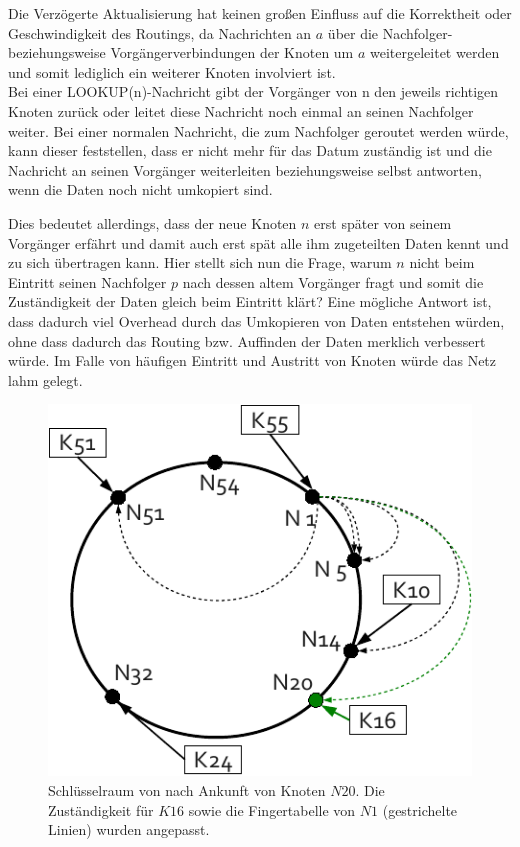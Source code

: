 Die Verzögerte Aktualisierung hat keinen großen Einfluss auf die Korrektheit oder Geschwindigkeit des Routings, da Nachrichten an $a$ über die Nachfolger- beziehungsweise Vorgängerverbindungen der Knoten um $a$ weitergeleitet werden und somit lediglich ein weiterer Knoten involviert ist.\\
Bei einer LOOKUP(n)-Nachricht gibt der Vorgänger von n den jeweils richtigen Knoten zurück oder leitet diese Nachricht noch einmal an seinen Nachfolger weiter. Bei einer normalen Nachricht, die zum Nachfolger geroutet werden würde, kann dieser feststellen, dass er nicht mehr für das Datum zuständig ist und die Nachricht an seinen Vorgänger weiterleiten beziehungsweise selbst antworten, wenn die Daten noch nicht umkopiert sind. 

Dies bedeutet allerdings, dass der neue Knoten $n$ erst später von seinem Vorgänger erfährt und damit auch erst spät alle ihm zugeteilten Daten kennt und zu sich übertragen kann. Hier stellt sich nun die Frage, warum $n$ nicht beim Eintritt seinen Nachfolger $p$ nach dessen altem Vorgänger fragt und somit die Zuständigkeit der Daten gleich beim Eintritt klärt? Eine mögliche Antwort ist, dass dadurch viel Overhead durch das Umkopieren von Daten entstehen würden, ohne dass dadurch das Routing bzw. Auffinden der Daten merklich verbessert würde. Im Falle von häufigen Eintritt und Austritt von Knoten würde das Netz lahm gelegt.

\begin{figure}[htbp]
\centering
\includegraphics{grafics/chord_new_node.pdf}
\caption{Schlüsselraum von  nach Ankunft von Knoten $N20$. Die Zuständigkeit für $K16$ sowie die Fingertabelle von $N1$ (gestrichelte Linien) wurden angepasst.}
\label{fig:chord_new_node}
\end{figure}

